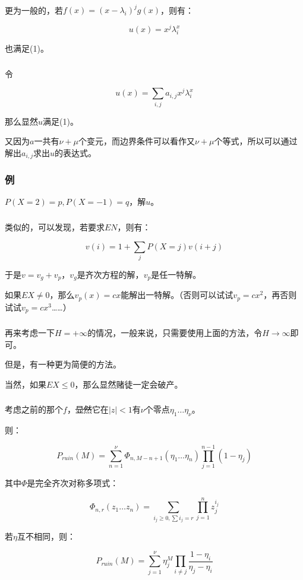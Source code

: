 \documentclass[10pt]{beamer}
\begin{document}
	\begin{frame}
		\frametitle{}
	
		更为一般的，若$f(x)=(x-\lambda_i)^j g(x)$，则有：

		$$
		u(x)=x^j\lambda_i^x
		$$

		也满足(1)。

	
	\end{frame}
	\begin{frame}
		\frametitle{}
	
		令

		$$
		u(x)=\sum_{i,j} a_{i,j}x^j\lambda_i^x
		$$

		那么显然$u$满足(1)。

		又因为$a$一共有$\nu+\mu$个变元，而边界条件可以看作又$\nu+\mu$个等式，所以可以通过解出$a_{i,j}$求出$u$的表达式。
	
	\end{frame}
	\begin{frame}
		\frametitle{例}
	
		$P(X=2)=p,P(X=-1)=q$，解$u$。
	
	\end{frame}
	\begin{frame}
		\frametitle{}
	
		类似的，可以发现，若要求$EN$，则有：

		$$
		v(i)=1+\sum_j P(X=j) v(i+j)
		$$

		于是$v=v_g+v_p$，$v_g$是齐次方程的解，$v_p$是任一特解。

		如果$EX\not=0$，那么$v_p(x)=cx$能解出一特解。（否则可以试试$v_p=cx^2$，再否则试试$v_p=cx^3$……）
	
	\end{frame}
	\begin{frame}
		\frametitle{}
	
		再来考虑一下$H=+\infty$的情况，一般来说，只需要使用上面的方法，令$H\rightarrow \infty$即可。

		但是，有一种更为简便的方法。

		当然，如果$EX\le 0$，那么显然赌徒一定会破产。
	
	\end{frame}
	\begin{frame}
		\frametitle{}
	
		考虑之前的那个$f$，\sout{显然}它在$|z|<1$有$\nu$个零点$\eta_1\dots \eta_\nu$。

		则：

		$$
		P_{ruin}(M)=\sum_{n=1}^\nu \Phi_{n,M-n+1}(\eta_1\dots \eta_n)\prod_{j=1}^{n-1}(1-\eta_j)
		$$

		其中$\Phi$是完全齐次对称多项式：

		$$
		\Phi_{n,r}(z_1\dots z_n)=\sum_{i_j\ge 0,\sum i_j=r}\prod_{j=1}^nz_j^{i_j}
		$$

		若$\eta$互不相同，则：

		$$
		P_{ruin}(M)=\sum_{j=1}^{\nu}\eta_j^M\prod_{i\not=j}\dfrac{1-\eta_i}{\eta_j-\eta_i}
		$$
	
	\end{frame}
\end{document}
